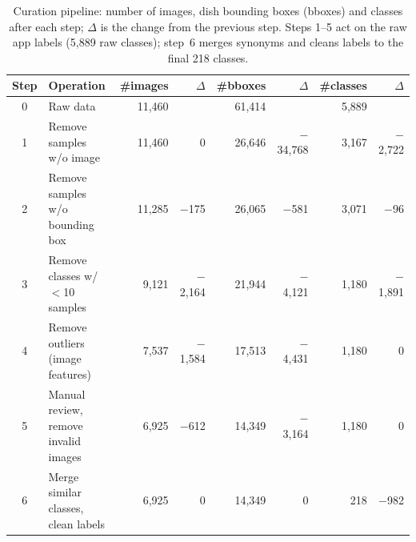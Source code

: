 \begin{table}[tb]
  \centering
  \caption{Curation pipeline: number of images, dish bounding boxes (bboxes) and classes after each step; $\Delta$ is the change from the previous step. Steps 1--5 act on the raw app labels (5,889 raw classes); step~6 merges synonyms and cleans labels to the final 218 classes.}
  \small
  \setlength{\tabcolsep}{4pt}
  \begin{tabular}{@{}cl rr rr rr@{}}
    \toprule
    Step & Operation & \#images & $\Delta$ & \#bboxes & $\Delta$ & \#classes & $\Delta$ \\
    \midrule
    0 & Raw data                                  & 11,460 &        & 61,414 &         & 5,889 &        \\
    1 & Remove samples w/o image                  & 11,460 & 0      & 26,646 & $-$34,768 & 3,167 & $-$2,722 \\
    2 & Remove samples w/o bounding box           & 11,285 & $-$175 & 26,065 & $-$581  & 3,071 & $-$96  \\
    3 & Remove classes w/ $<$10 samples           & 9,121  & $-$2,164 & 21,944 & $-$4,121 & 1,180 & $-$1,891 \\
    4 & Remove outliers (image features)          & 7,537  & $-$1,584 & 17,513 & $-$4,431 & 1,180 & 0      \\
    5 & Manual review, remove invalid images      & 6,925  & $-$612 & 14,349 & $-$3,164 & 1,180 & 0      \\
    6 & Merge similar classes, clean labels       & 6,925  & 0      & 14,349 & 0       & 218   & $-$982 \\
    \bottomrule
  \end{tabular}
  \label{data cleaning steps table}
\end{table}
